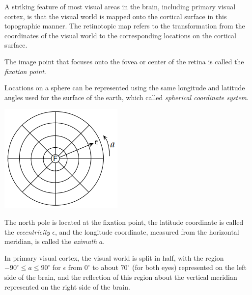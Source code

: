 \begin{rem}
  A striking feature of most visual areas in the brain, including primary visual cortex, is that the visual world is mapped onto the cortical surface in this topographic manner.
  The retinotopic map refers to the transformation from the coordinates of the visual world to the corresponding locations on the cortical surface.
\end{rem}

\begin{defn}
  \label{def:fixationPoint}
  The image point that focuses onto the fovea or center of the retina is called the \emph{fixation point}.
\end{defn}

\begin{defn}
  \label{def:sphericalCoord}
  Locations on a sphere can be represented using the same longitude and latitude angles used for the surface of the earth, which called \emph{spherical coordinate system}.
  \begin{center}
    \includegraphics[scale=0.4]{./png/sphericalCoord}
  \end{center}
  The north pole is located at the fixation point, the latitude coordinate is called the \emph{eccentricity} $\epsilon$, and the longitude coordinate, measured from the horizontal meridian, is called the \emph{azimuth} $a$.
\end{defn}

\begin{prin}
  \label{prin:primaryVisualCortexRepresent}
  In primary visual cortex, the visual world is split in half, with the region $-90^{\circ} \leq a \leq 90^{\circ}$ for $\epsilon$ from $0^{\circ}$ to about $70^{\circ}$ (for both eyes) represented on the left side of the brain, and the reflection of this region about the vertical meridian represented on the right side of the brain.
\end{prin}


